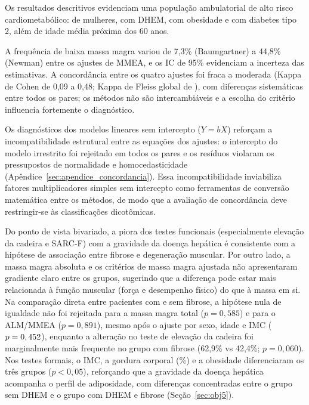 \documentclass[11pt,a4paper]{article}
\begin{document}
Os resultados descritivos evidenciam uma população ambulatorial de alto risco
cardiometabólico: \PercMulheres{} de mulheres, \PercDHEM{} com DHEM, \PercObesidade{} com
obesidade e \PercDiabetes{} com diabetes tipo 2, além de idade média próxima
dos 60 anos.

A frequência de baixa massa magra variou de 7,3\% (Baumgartner) a 44,8\%
(Newman) entre os ajustes de MMEA, e os IC de 95\% evidenciam a incerteza das
estimativas. A concordância entre os quatro ajustes foi fraca a moderada
(Kappa de Cohen de 0,09 a 0,48; Kappa de Fleiss global de \KappaFleiss{}), com
diferenças sistemáticas entre todos os pares; os métodos não são intercambiáveis
e a escolha do critério influencia fortemente o diagnóstico.

Os diagnósticos dos modelos lineares sem intercepto ($Y = bX$) reforçam a
incompatibilidade estrutural entre as equações dos ajustes: o intercepto do
modelo irrestrito foi rejeitado em todos os pares e os resíduos violaram os
pressupostos de normalidade e homocedasticidade
(Apêndice~\ref{sec:apendice_concordancia}). Essa incompatibilidade inviabiliza
fatores multiplicadores simples sem intercepto como ferramentas de conversão
matemática entre os métodos, de modo que a avaliação de concordância deve
restringir-se às classificações dicotômicas.

Do ponto de vista bivariado, a piora dos testes funcionais (especialmente
elevação da cadeira e SARC-F) com a gravidade da doença hepática é consistente
com a hipótese de associação entre fibrose e degeneração muscular. Por outro
lado, a massa magra absoluta e os critérios de massa magra ajustada não
apresentaram gradiente claro entre os grupos, sugerindo que a diferença pode
estar mais relacionada à função muscular (força e desempenho físico) do que à
massa em si. Na comparação direta entre pacientes com e sem fibrose, a hipótese
nula de igualdade não foi rejeitada para a massa magra total ($p = 0{,}585$) e
para o ALM/MMEA ($p = 0{,}891$), mesmo após o ajuste por sexo, idade e IMC
($p = 0,452{}$), enquanto a alteração no teste de elevação da cadeira foi
marginalmente mais frequente no grupo com fibrose (62,9\% vs 42,4\%;
$p = 0{,}060$). Nos testes formais, o IMC, a gordura corporal (\%) e a
obesidade diferenciaram os três grupos ($p < 0{,}05$), reforçando que a
gravidade da doença hepática acompanha o perfil de adiposidade, com diferenças
concentradas entre o grupo sem DHEM e o grupo com DHEM e fibrose
(Seção~\ref{sec:obj5}).
\end{document}
